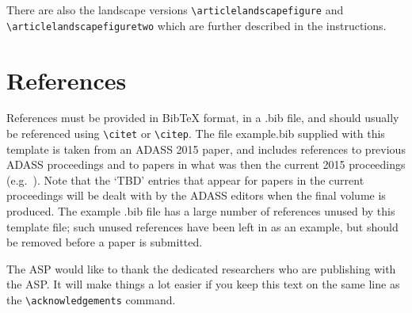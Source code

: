 \documentclass[11pt,twoside]{article}
\begin{document}
There are also the landscape versions \verb"\articlelandscapefigure" and \\
\verb"\articlelandscapefiguretwo" which are further described in the instructions.

\section{References}
References must be provided in BibTeX format, in a .bib file, and should usually be referenced using \verb"\citet" or \verb"\citep". The file example.bib supplied with this template is taken from an ADASS 2015 paper, and includes references to previous ADASS proceedings 
\citep[such as][]{1999ASPC..172..487P} and to papers in what was then the current 2015 proceedings (e.g.\ \citet{O11-4_adassxxv}). Note that the `TBD' entries that appear for papers in the current proceedings will be dealt with by the ADASS editors when the final volume is produced. The example .bib file has a large number of references unused by this template file; such unused references have been left in as an example, but should be removed before a paper is submitted.

\acknowledgements The ASP would like to thank the dedicated researchers who are publishing with the ASP.  It will make things a lot easier if you keep this text on the same line as the \verb"\acknowledgements" command.


\end{document}
